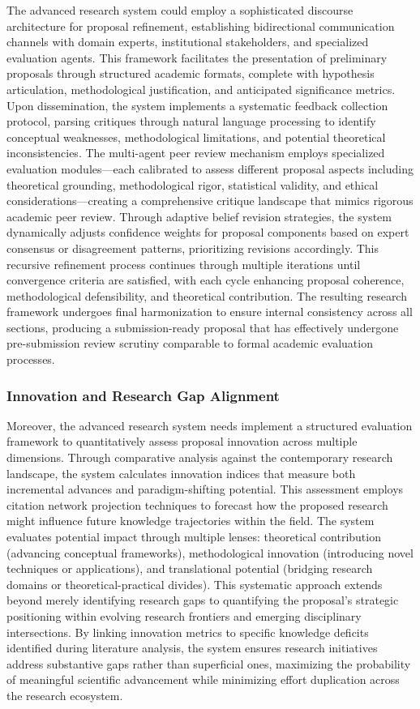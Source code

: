 The advanced research system could employ a sophisticated discourse architecture for proposal refinement, establishing bidirectional communication channels with domain experts, institutional stakeholders, and specialized evaluation agents. This framework facilitates the presentation of preliminary proposals through structured academic formats, complete with hypothesis articulation, methodological justification, and anticipated significance metrics. Upon dissemination, the system implements a systematic feedback collection protocol, parsing critiques through natural language processing to identify conceptual weaknesses, methodological limitations, and potential theoretical inconsistencies. The multi-agent peer review mechanism employs specialized evaluation modules—each calibrated to assess different proposal aspects including theoretical grounding, methodological rigor, statistical validity, and ethical considerations—creating a comprehensive critique landscape that mimics rigorous academic peer review. Through adaptive belief revision strategies, the system dynamically adjusts confidence weights for proposal components based on expert consensus or disagreement patterns, prioritizing revisions accordingly. This recursive refinement process continues through multiple iterations until convergence criteria are satisfied, with each cycle enhancing proposal coherence, methodological defensibility, and theoretical contribution. The resulting research framework undergoes final harmonization to ensure internal consistency across all sections, producing a submission-ready proposal that has effectively undergone pre-submission review scrutiny comparable to formal academic evaluation processes.

\subsubsection*{Innovation and Research Gap Alignment}

Moreover, the advanced research system needs implement a structured evaluation framework to quantitatively assess proposal innovation across multiple dimensions. Through comparative analysis against the contemporary research landscape, the system calculates innovation indices that measure both incremental advances and paradigm-shifting potential. This assessment employs citation network projection techniques to forecast how the proposed research might influence future knowledge trajectories within the field. The system evaluates potential impact through multiple lenses: theoretical contribution (advancing conceptual frameworks), methodological innovation (introducing novel techniques or applications), and translational potential (bridging research domains or theoretical-practical divides). This systematic approach extends beyond merely identifying research gaps to quantifying the proposal's strategic positioning within evolving research frontiers and emerging disciplinary intersections. By linking innovation metrics to specific knowledge deficits identified during literature analysis, the system ensures research initiatives address substantive gaps rather than superficial ones, maximizing the probability of meaningful scientific advancement while minimizing effort duplication across the research ecosystem.


